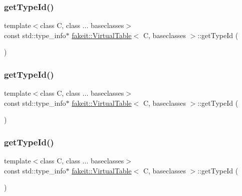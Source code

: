 \subsubsection{\texorpdfstring{getTypeId()}{getTypeId()}\hspace{0.1cm}{\footnotesize\ttfamily [6/9]}}
{\footnotesize\ttfamily template$<$class C, class ... baseclasses$>$ \\
const std\+::type\+\_\+info$\ast$ \mbox{\hyperlink{structfakeit_1_1VirtualTable}{fakeit\+::\+Virtual\+Table}}$<$ C, baseclasses $>$\+::get\+Type\+Id (\begin{DoxyParamCaption}{ }\end{DoxyParamCaption})\hspace{0.3cm}{\ttfamily [inline]}}

\mbox{\label{structfakeit_1_1VirtualTable_a5ed35b122d5d06afced80ab93062bfa3}} 
\subsubsection{\texorpdfstring{getTypeId()}{getTypeId()}\hspace{0.1cm}{\footnotesize\ttfamily [7/9]}}
{\footnotesize\ttfamily template$<$class C, class ... baseclasses$>$ \\
const std\+::type\+\_\+info$\ast$ \mbox{\hyperlink{structfakeit_1_1VirtualTable}{fakeit\+::\+Virtual\+Table}}$<$ C, baseclasses $>$\+::get\+Type\+Id (\begin{DoxyParamCaption}{ }\end{DoxyParamCaption})\hspace{0.3cm}{\ttfamily [inline]}}

\mbox{\label{structfakeit_1_1VirtualTable_a5ed35b122d5d06afced80ab93062bfa3}} 
\subsubsection{\texorpdfstring{getTypeId()}{getTypeId()}\hspace{0.1cm}{\footnotesize\ttfamily [8/9]}}
{\footnotesize\ttfamily template$<$class C, class ... baseclasses$>$ \\
const std\+::type\+\_\+info$\ast$ \mbox{\hyperlink{structfakeit_1_1VirtualTable}{fakeit\+::\+Virtual\+Table}}$<$ C, baseclasses $>$\+::get\+Type\+Id (\begin{DoxyParamCaption}{ }\end{DoxyParamCaption})\hspace{0.3cm}{\ttfamily [inline]}}

